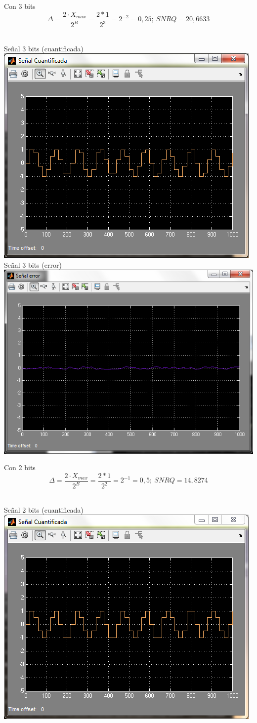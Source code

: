 \documentclass[a4paper,12pt]{article}
\begin{document}
\begin{enumerate}
\begin{center}
\end{center}
Con 3 bits
$$\Delta = \frac{2 \cdot X_{max}}{2^B} = \frac{2 * 1}{2^3} = 2^{-2} = 0,25;\ SNRQ = 20,6633 $$\\
\begin{center}
Señal 3 bits (cuantificada)\\
\includegraphics[width=.65 \textwidth]{signal-cuantificada-3-bits.png}\\
Señal 3 bits (error)\\
\includegraphics[width=.65 \textwidth]{signal-error-3-bits.png}\\
\end{center}
Con 2 bits
$$\Delta = \frac{2 \cdot X_{max}}{2^B} = \frac{2 * 1}{2^2} = 2^{-1} = 0,5;\ SNRQ = 14,8274 $$\\
\begin{center}
Señal 2 bits (cuantificada)\\
\includegraphics[width=.65 \textwidth]{signal-cuantificada-2-bits.png}\\

\end{center}
\end{enumerate}
\end{document}
